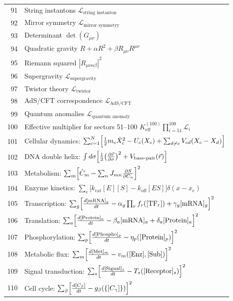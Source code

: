 \documentclass[12pt,a4paper]{article}
\begin{document}
\begin{longtable}{r l}
		91 & String instantons \(\mathcal{L}_{\text{string instanton}}\) \\
		92 & Mirror symmetry \(\mathcal{L}_{\text{mirror symmetry}}\) \\
		93 & Determinant \(\det(G_{\mu\nu})\) \\
		94 & Quadratic gravity \(R + \alpha R^2 + \beta R_{\mu\nu}R^{\mu\nu}\) \\
		95 & Riemann squared \(|R_{\mu\nu\alpha\beta}|^2\) \\
		96 & Supergravity \(\mathcal{L}_{\text{supergravity}}\) \\
		97 & Twistor theory \(\mathcal{L}_{\text{twistor}}\) \\
		98 & AdS/CFT correspondence \(\mathcal{L}_{\text{AdS/CFT}}\) \\
		99 & Quantum anomalies \(\mathcal{L}_{\text{quantum anomaly}}\) \\
		100 & Effective multiplier for sectors 51–100 \(K^{(100)}_{\mathrm{eff}}\prod_{i=51}^{100}\mathcal{L}_i\) \\
		101 & Cellular dynamics: $\sum_{c=1}^{N}\Bigl[\frac12 m_c\dot X_c^2 - U_c(X_c) + \sum_{d\neq c}V_{cd}(X_c-X_d)\Bigr]$ \\
		102 & DNA double helix: $\int d\sigma\Bigl[\frac12\bigl(\frac{\partial\vec r}{\partial\sigma}\bigr)^2 + V_{\text{base-pair}}(\vec r)\Bigr]$ \\
		103 & Metabolism: $\sum_m\Bigl[\dot C_m - \sum_n J_{mn}\frac{\partial S}{\partial C_n}\Bigr]^2$ \\
		104 & Enzyme kinetics: $\sum_e\bigl[k_{\text{cat}}[E][S] - k_{\text{off}}[ES]\bigr]\delta(x-x_e)$ \\
		105 & Transcription: $\sum_g\Bigl[\frac{d[\text{mRNA}]_g}{dt} - \alpha_g\prod_r f_r([\text{TF}_r]) + \gamma_g[\text{mRNA}]_g\Bigr]^2$ \\
		106 & Translation: $\sum_a\Bigl[\frac{d[\text{Protein}]_a}{dt} - \beta_a[\text{mRNA}]_a + \delta_a[\text{Protein}]_a\Bigr]^2$ \\
		107 & Phosphorylation: $\sum_p\Bigl[\frac{d[\text{Phospho}]_p}{dt} - \eta_p([\text{Protein}]_p)\Bigr]^2$ \\
		108 & Metabolic flux: $\sum_m\Bigl[\frac{d[\text{Met}]_m}{dt} - v_m([\text{Enz}],[\text{Sub}])\Bigr]^2$ \\
		109 & Signal transduction: $\sum_s\Bigl[\frac{d[\text{Signal}]_s}{dt} - T_s([\text{Receptor}]_s)\Bigr]^2$ \\
		110 & Cell cycle: $\sum_\beta\Bigl[\frac{d[C_\beta]}{dt} - g_\beta(\{[C_\gamma]\})\Bigr]^2$ \\

\end{longtable}
\end{document}
